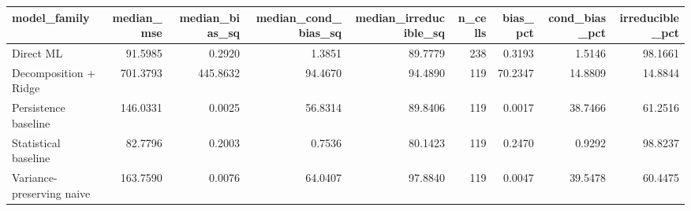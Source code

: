 \begin{tabular}{lrrrrrrrr}
\toprule
model\_family & median\_mse & median\_bias\_sq & median\_cond\_bias\_sq & median\_irreducible\_sq & n\_cells & bias\_pct & cond\_bias\_pct & irreducible\_pct \\
\midrule
Direct ML & 91.5985 & 0.2920 & 1.3851 & 89.7779 & 238 & 0.3193 & 1.5146 & 98.1661 \\
Decomposition + Ridge & 701.3793 & 445.8632 & 94.4670 & 94.4890 & 119 & 70.2347 & 14.8809 & 14.8844 \\
Persistence baseline & 146.0331 & 0.0025 & 56.8314 & 89.8406 & 119 & 0.0017 & 38.7466 & 61.2516 \\
Statistical baseline & 82.7796 & 0.2003 & 0.7536 & 80.1423 & 119 & 0.2470 & 0.9292 & 98.8237 \\
Variance-preserving naive & 163.7590 & 0.0076 & 64.0407 & 97.8840 & 119 & 0.0047 & 39.5478 & 60.4475 \\
\bottomrule
\end{tabular}
